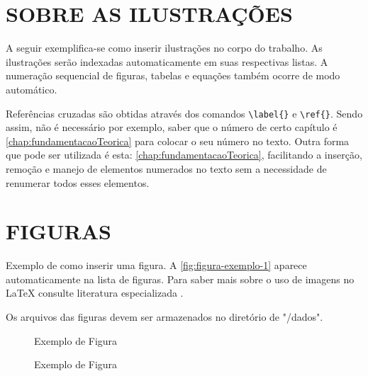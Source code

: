 

\chapter{SOBRE AS ILUSTRAÇÕES}
\label{chap:apSobreIlust}

A seguir exemplifica-se como inserir ilustrações no corpo do trabalho. As ilustrações serão indexadas automaticamente em suas respectivas listas. A numeração sequencial de figuras, tabelas e equações também ocorre de modo automático.

Referências cruzadas são obtidas através dos comandos \verb|\label{}| e \verb|\ref{}|. Sendo assim, não é necessário por exemplo, saber que o número de certo capítulo é \ref{chap:fundamentacaoTeorica} para colocar o seu número no texto. Outra forma que pode ser utilizada é esta: \autoref{chap:fundamentacaoTeorica}, facilitando a inserção, remoção e manejo de elementos numerados no texto sem a necessidade de renumerar todos esses elementos.

\chapter{FIGURAS}
\label{chap:figuras}

Exemplo de como inserir uma figura. A \autoref{fig:figura-exemplo-1} aparece automaticamente na lista de figuras. Para saber mais sobre o uso de imagens no \LaTeX{} consulte literatura especializada \cite{Goossens2007}.

Os arquivos das figuras devem ser armazenados no diretório de "/dados".

\begin{figure}[!htb]
    \centering
    \begin{minipage}{\wd0}
        \caption{Exemplo de Figura}
        \label{fig:figura-exemplo-1}
    \end{minipage}
\end{figure}

\begin{figure}[!htb]
    \centering
    \begin{minipage}{\wd0}
        \caption{Exemplo de Figura}
        \label{fig:figura-exemplo-2}
    \end{minipage}
\end{figure}

